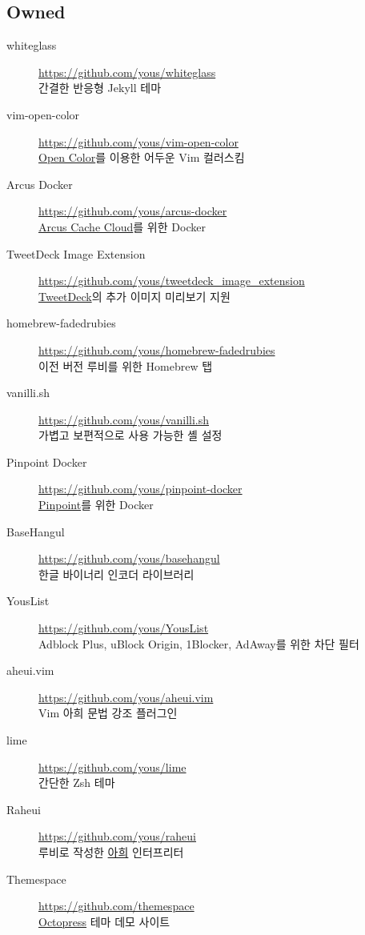 \documentclass[a4paper,10pt]{article}
\begin{document}
\subsection{Owned}
\begin{description}
  \item[whiteglass] \url{https://github.com/yous/whiteglass} \\
    간결한 반응형 Jekyll 테마
  \item[vim-open-color] \url{https://github.com/yous/vim-open-color} \\
    \href{https://yeun.github.io/open-color/}{Open Color}를 이용한 어두운 Vim 컬러스킴
  \item[Arcus Docker] \url{https://github.com/yous/arcus-docker} \\
    \href{https://github.com/naver/arcus}{Arcus Cache Cloud}를 위한 Docker
  \item[TweetDeck Image Extension] \url{https://github.com/yous/tweetdeck_image_extension} \\
    \href{https://tweetdeck.twitter.com}{TweetDeck}의 추가 이미지 미리보기 지원
  \item[homebrew-fadedrubies] \url{https://github.com/yous/homebrew-fadedrubies} \\
    이전 버전 루비를 위한 Homebrew 탭
  \item[vanilli.sh] \url{https://github.com/yous/vanilli.sh} \\
    가볍고 보편적으로 사용 가능한 셸 설정
  \item[Pinpoint Docker] \url{https://github.com/yous/pinpoint-docker} \\
    \href{https://github.com/naver/pinpoint}{Pinpoint}를 위한 Docker
  \item[BaseHangul] \url{https://github.com/yous/basehangul} \\
    한글 바이너리 인코더 라이브러리
  \item[YousList] \url{https://github.com/yous/YousList} \\
    Adblock Plus, uBlock Origin, 1Blocker, AdAway를 위한 차단 필터
  \item[aheui.vim] \url{https://github.com/yous/aheui.vim} \\
    Vim 아희 문법 강조 플러그인
  \item[lime] \url{https://github.com/yous/lime} \\
    간단한 Zsh 테마
  \item[Raheui] \url{https://github.com/yous/raheui} \\
    루비로 작성한 \href{http://aheui.github.io}{아희} 인터프리터
  \item[Themespace] \url{https://github.com/themespace} \\
    \href{http://octopress.org}{Octopress} 테마 데모 사이트
\end{description}
\end{document}
